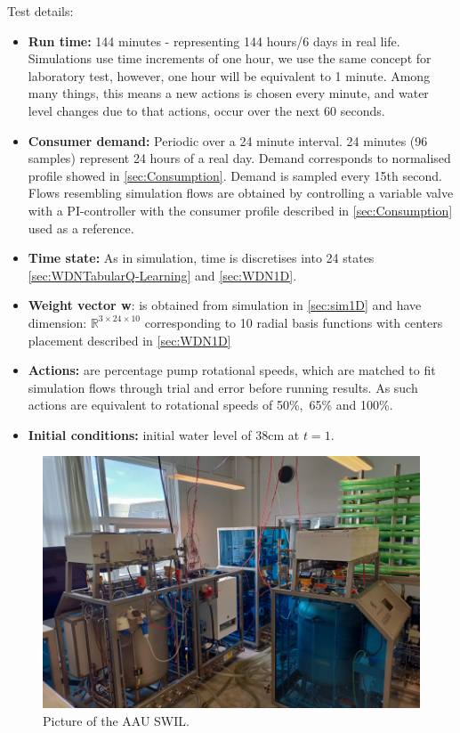 Test details:
\begin{itemize}
	\item \textbf{Run time:} 144 minutes - representing 144 hours/6 days in real life. Simulations use time increments of one hour, we use the same concept for laboratory test, however, one hour will be equivalent to 1 minute. Among many things, this means a new actions is chosen every minute, and water level changes due to that actions, occur over the next 60 seconds.\\
	
	\item \textbf{Consumer demand:} Periodic over a 24 minute interval. 24 minutes (96 samples) represent 24 hours of a real day. Demand corresponds to normalised profile showed in \cref{sec:Consumption}. Demand is sampled every 15th second. Flows resembling simulation flows are obtained by controlling a variable valve with a PI-controller with the consumer profile described in \cref{sec:Consumption} used as a reference.\\
		
	\item \textbf{Time state:} As in simulation, time is discretises into 24 states \cref{sec:WDNTabularQ-Learning} and \cref{sec:WDN1D}.	
		
	\item \textbf{Weight vector \textbf{w}}: is obtained from simulation in \cref{sec:sim1D} and have dimension: $ \mathbb{R}^{3 \times 24 \times 10} $ corresponding to 10 radial basis functions with centers placement described in \cref{sec:WDN1D} \\ 
	
	\item \textbf{Actions:} are percentage pump rotational speeds, which are matched to fit simulation flows through trial and error before running results. As such actions are equivalent to rotational speeds of 50\%,\ 65\% and 100\%.
	
	\item  \textbf{Initial conditions:} initial water level of 38cm at $t=1$.
\end{itemize}

\begin{figure}[h!]
	\centering
	\includegraphics[width=0.7\linewidth]{Figures/SWIL.pdf}
	\caption{Picture of the AAU SWIL.}
	\label{fig:AAUSWIL}
\end{figure}

